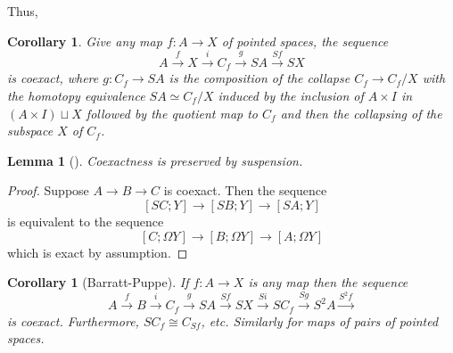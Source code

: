 \documentclass[reqno]{amsart}
\newtheorem{lemma}[theorem]{Lemma}
\newtheorem{corollary}[theorem]{Corollary}
\theoremstyle{definition}
\theoremstyle{remark}
\begin{document}
 Thus,
 \begin{corollary}
     Give any map
     $f \colon A \to X$ of pointed spaces,
     the sequence
     \[
     A \stackrel{f}{\to} X \stackrel{i}{\to} 
     C_f \stackrel{g}{\to} SA \stackrel{Sf}{\to} 
     SX
     \] 
     is coexact, where
     $g \colon C_f \to SA$ is the composition
     of the collapse $C_f \to C_f /X$ with
     the homotopy equivalence
     $SA \simeq C_f / X$ induced by the inclusion
     of $A \times I$ in $\left( A \times I \right) 
     \sqcup X$ followed by the quotient map to
     $C_f$ and then the collapsing of the subspace
      $X$ of $C_f$.
 \end{corollary}

 \begin{lemma}[]
     Coexactness is preserved by suspension.
 \end{lemma}

 \begin{proof}
     Suppose $A \to B \to C$ is coexact.
     Then the sequence
     \[
     \left[ SC;Y \right] \to 
     \left[ SB;Y \right] 
     \to \left[ SA;Y \right] 
     \] 
     is equivalent to the sequence
     \[
     \left[ C;\Omega Y \right] 
     \to \left[ B ; \Omega Y \right] 
     \to \left[ A; \Omega Y \right] 
     \] 
     which is exact by assumption.
 \end{proof}

 \begin{corollary}[Barratt-Puppe]
     If $f \colon A \to X$ is any map then the sequence
     \[
     A \stackrel{f}{\to} B \stackrel{i}{\to} 
     C_f \stackrel{g}{\to} SA
     \stackrel{Sf}{\to} SX \stackrel{Si}{\to} 
     SC_f \stackrel{Sg}{\to} 
     S^2 A \stackrel{S^2 f}{\to} 
     \] 
     is coexact. Furthermore, 
     $SC_f \cong C_{Sf}$, etc. Similarly for maps
     of pairs of pointed spaces.
 \end{corollary}






\end{document}
